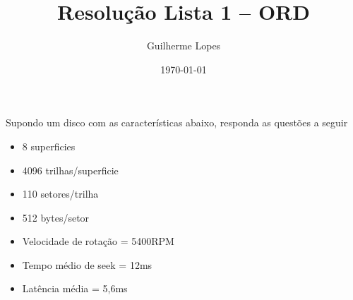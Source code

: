 \documentclass[12pt]{article}
\title{Resolução Lista 1 -- ORD}
\author{Guilherme Lopes}
\date{\today}
\begin{document}
\maketitle
Supondo um disco com as características abaixo, responda as questões a seguir
\begin{itemize}
    \item 8 superficies
    \item 4096 trilhas/superficie
    \item 110 setores/trilha
    \item 512 bytes/setor
    \item Velocidade de rotação = 5400RPM
    \item Tempo médio de seek = 12ms
    \item Latência média = 5,6ms
\end{itemize}
\end{document}
